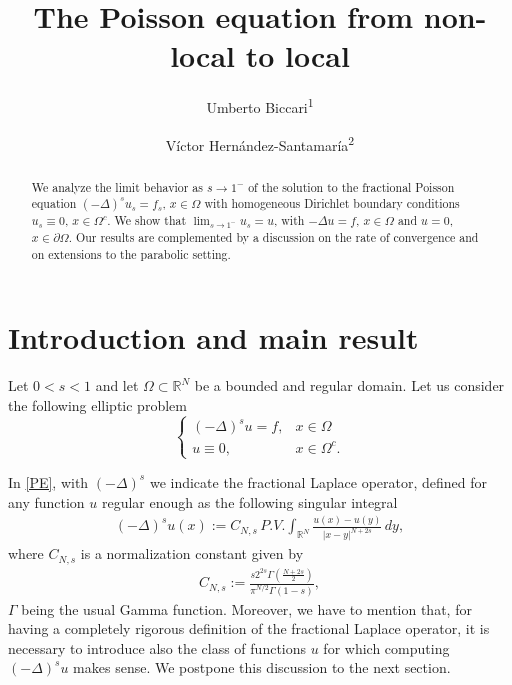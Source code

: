 \documentclass[reqno,twoside]{amsart}
\title{The Poisson equation from non-local to local}
\author{Umberto Biccari\textsuperscript{1}}
\author{V\'ictor Hern\'andez-Santamar\'ia\textsuperscript{2}}
\numberwithin{equation}{section}
\def\RR{{\mathbb{R}}}
\newcommand{\fl}[2]{(-\Delta)^#1#2}
\newcommand{\cns}{C_{N,s}}
\begin{document}


\begin{abstract}
We analyze the limit behavior as $s\to 1^-$ of the solution to the fractional Poisson equation $\fl{s}{u_s}=f_s$, $x\in\Omega$ with homogeneous Dirichlet boundary conditions $u_s\equiv 0$, $x\in\Omega^c$. 
We show that $\lim_{s\to 1^-} u_s =u$, with $-\Delta u =f$, $x\in\Omega$ and $u=0$, $x\in\partial\Omega$. Our results are complemented by a discussion on the rate of convergence and on extensions to the parabolic setting.
\end{abstract}

\maketitle

\section{Introduction and main result}\label{intro}

Let $0<s<1$ and let $\Omega\subset\RR^N$ be a bounded and regular domain. Let us consider the following elliptic problem
\begin{equation}\label{PE}
	\begin{cases}
	\fl{s}{u} = f, &x\in\Omega\tag{$\mathcal P_s$}
	\\
	u\equiv 0, & x\in\Omega^c.
	\end{cases}
\end{equation}

In \eqref{PE}, with $\fl{s}{}$ we indicate the fractional Laplace operator, defined for any function $u$ regular enough as the following singular integral
\begin{align}\label{frac_lapl}
	\fl{s}{u}(x):=\cns\,P.V.\int_{\RR^N} \frac{u(x)-u(y)}{|x-y|^{N+2s}}\,dy,
\end{align}
where $\cns$ is a normalization constant given by
\begin{align}\label{cns}
	\cns:= \frac{s2^{2s}\Gamma\left(\frac{N+2s}{2}\right)}{\pi^{N/2}\Gamma(1-s)},
\end{align}
$\Gamma$ being the usual Gamma function. Moreover, we have to mention that, for having a completely rigorous definition of the fractional Laplace operator, it is necessary to introduce also the class of functions $u$ for which computing $\fl{s}{u}$ makes sense. We postpone this discussion to the next section.
\end{document}
